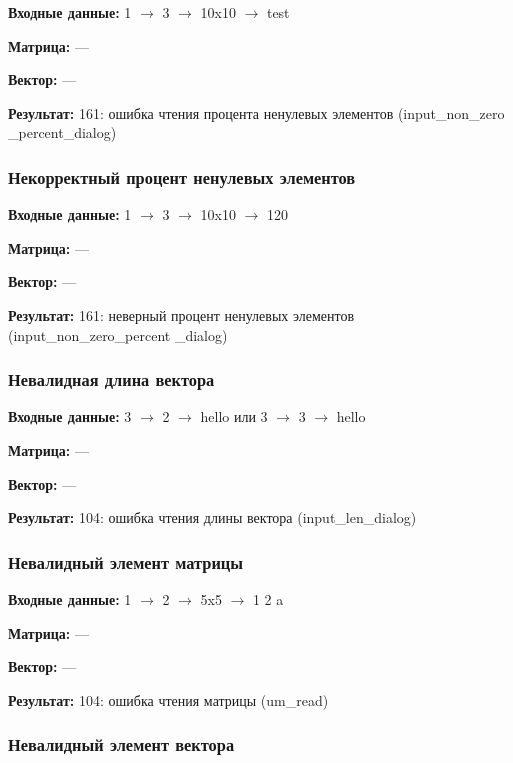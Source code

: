\documentclass[a4paper,12pt]{extarticle}
\begin{document}
\textbf{Входные данные: }
1 $\rightarrow$ 3 $\rightarrow$ 10x10 $\rightarrow$ test

\textbf{Матрица: }
---

\textbf{Вектор: }
---

\textbf{Результат: }
161: ошибка чтения процента ненулевых элементов (input\_non\_zero \_percent\_dialog)

\subsubsection{Некорректный процент ненулевых элементов}


\textbf{Входные данные: }
1 $\rightarrow$ 3 $\rightarrow$ 10x10 $\rightarrow$ 120

\textbf{Матрица: }
---

\textbf{Вектор: }
---

\textbf{Результат: }
161: неверный процент ненулевых элементов (input\_non\_zero\_percent \_dialog)

\subsubsection{Невалидная длина вектора}



\textbf{Входные данные: }
3 $\rightarrow$ 2 $\rightarrow$ hello или 3 $\rightarrow$ 3 $\rightarrow$ hello 

\textbf{Матрица: }
---

\textbf{Вектор: }
---

\textbf{Результат: }
104: ошибка чтения длины вектора (input\_len\_dialog)

\subsubsection{Невалидный элемент матрицы}



\textbf{Входные данные: }
1 $\rightarrow$ 2 $\rightarrow$ 5x5 $\rightarrow$ 1 2 a

\textbf{Матрица: }
---

\textbf{Вектор: }
---

\textbf{Результат: }
104: ошибка чтения матрицы (um\_read)

\subsubsection{Невалидный элемент вектора}
\end{document}
